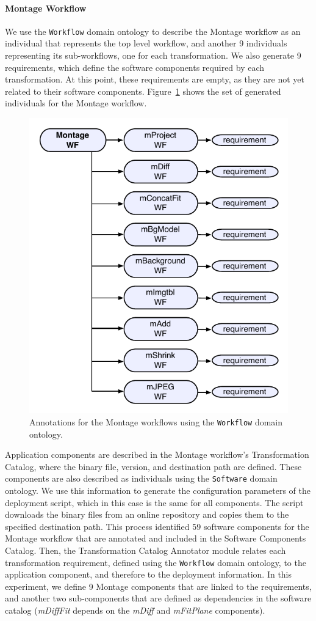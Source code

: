 \paragraph{\textbf{Montage Workflow}}
We use the \texttt{Workflow} domain ontology to describe the Montage workflow 
as an individual that represents the top level workflow, and another 9 individuals 
representing its sub-workflows, one for each transformation. We also generate 9 
requirements, which define the software components required by each transformation. 
At this point, these requirements are empty, as they are not yet related to their 
software components. Figure~\ref{fig:annotations-montage} shows the set of 
generated individuals for the Montage workflow.

\begin{figure}[!htb]
	\centering
	\includegraphics[width=.7\linewidth]{figures/annotations-montage}
	\vspace{-10pt}
	\caption{Annotations for the Montage workflows using the \texttt{Workflow} domain ontology.}
	\label{fig:annotations-montage}
\end{figure}

Application components are described in the Montage workflow's Transformation 
Catalog, where the binary file, version, and destination path are defined. These 
components are also described as individuals using the \texttt{Software} domain 
ontology. We use this information to generate the configuration parameters of the 
deployment script, which in this case is the same for all components. The script 
downloads the binary files from an online repository and copies them to the specified 
destination path. This process identified 59 software components for the Montage 
workflow that are annotated and included in the Software Components Catalog.
Then, the Transformation Catalog Annotator module relates each transformation 
requirement, defined using the \texttt{Workflow} domain ontology, to the application 
component, and therefore to the deployment information. In this experiment, we 
define 9 Montage components that are linked to the requirements, and another two 
sub-components that are defined as dependencies in the software catalog 
(\emph{mDiffFit} depends on the \emph{mDiff} and \emph{mFitPlane} components).


